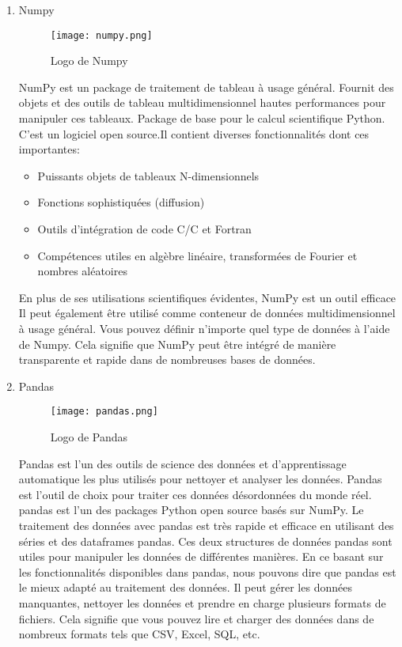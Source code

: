     \begin{enumerate}\bfseries
        \item Numpy
        \begin{figure}[H]
            \centering
            \texttt{[image: numpy.png]}
            \caption{Logo de Numpy}\label{fig:numpy}
        \end{figure}
        \normalfont
        NumPy est un package de traitement de tableau à usage général. Fournit des objets et des outils de tableau multidimensionnel hautes performances  pour manipuler ces tableaux. Package de base pour le calcul scientifique  Python. C'est un logiciel open source.Il contient diverses fonctionnalités dont ces importantes:
        \begin{itemize}[label=$\bullet$]
            \item Puissants objets de tableaux N-dimensionnels 
            \item Fonctions sophistiquées (diffusion)
            \item Outils d'intégration de code C/C et Fortran
            \item Compétences utiles en algèbre linéaire, transformées de Fourier et nombres aléatoires
        \end{itemize}  
        
        En plus de ses utilisations scientifiques évidentes, NumPy est un outil efficace Il peut également être utilisé comme  conteneur de données  multidimensionnel à usage général. Vous pouvez définir n'importe quel type de données  à l'aide de Numpy. Cela signifie que NumPy peut être intégré de manière transparente et rapide dans de nombreuses bases de données.

        \bfseries
        \item Pandas
        \begin{figure}[H]
            \centering
            \texttt{[image: pandas.png]}
            \caption{Logo de Pandas}\label{fig:pandas}
        \end{figure}
        \normalfont
        Pandas est l'un des outils de science des données et d'apprentissage automatique les plus utilisés pour nettoyer et analyser les données. 
        Pandas est l'outil de choix pour traiter ces données désordonnées du monde réel.  pandas est l'un des packages Python open source basés sur NumPy. 
        Le traitement des données avec pandas est très rapide et efficace en utilisant des séries et des dataframes pandas. Ces deux structures de données pandas sont utiles pour manipuler les données de différentes manières. 
        En ce basant sur les fonctionnalités disponibles dans  pandas, nous pouvons dire que  pandas est le mieux adapté au traitement des données. Il peut gérer les données manquantes, nettoyer les données et prendre en charge plusieurs formats de fichiers. Cela signifie que vous pouvez lire et charger des données dans de nombreux formats tels que CSV, Excel, SQL, etc.



\end{enumerate}
